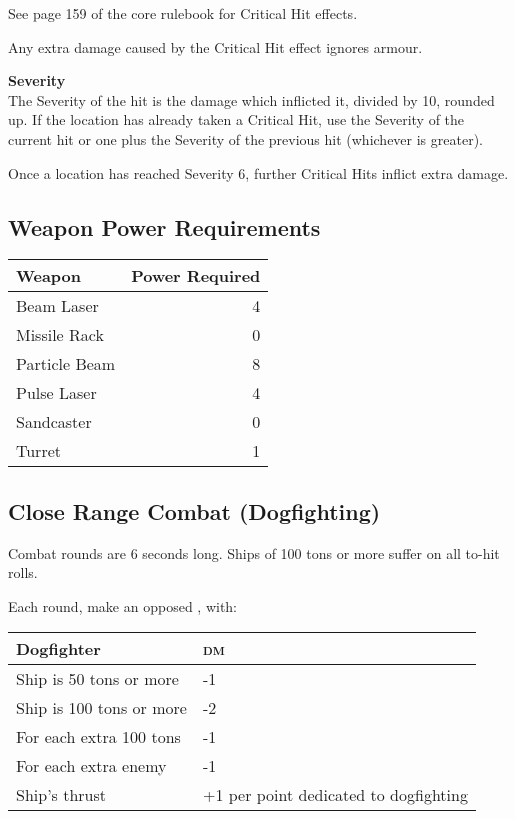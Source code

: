 \documentclass{cheatsheet}
\begin{document}
\begin{multicols}{3}
See page 159 of the core rulebook for Critical Hit effects.

Any extra damage caused by the Critical Hit effect ignores armour.

\textbf{Severity}\\
The Severity of the hit is the damage which inflicted it, divided by
10, rounded up.  If the location has already taken a Critical Hit, use
the Severity of the current hit or one plus the Severity of the
previous hit (whichever is greater).

Once a location has reached Severity 6, further Critical Hits inflict
 extra damage.

\subsection{Weapon Power Requirements}

\begin{tabularx}{\linewidth}{Xr} \toprule
  Weapon & Power Required \\ \midrule
  Beam Laser & 4 \\
  Missile Rack & 0 \\
  Particle Beam & 8 \\
  Pulse Laser & 4 \\
  Sandcaster & 0 \\
  Turret & 1 \\ \bottomrule
\end{tabularx}

\subsection{Close Range Combat (Dogfighting)}

Combat rounds are 6 seconds long.  Ships of 100 tons or more suffer
 on all to-hit rolls.

Each round, make an opposed , with:

\begin{tabularx}{\linewidth}{lX} \toprule
  Dogfighter & \textsc{dm} \\ \midrule
  Ship is 50 tons or more & -1 \\
  Ship is 100 tons or more & -2 \\
  For each extra 100 tons & -1 \\
  For each extra enemy & -1 \\
  Ship's thrust & +1 per point dedicated to dogfighting \\ \bottomrule
\end{tabularx}


\end{multicols}
\end{document}
